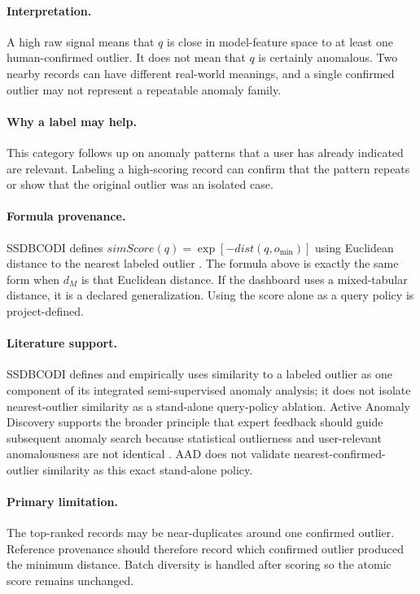 \documentclass[11pt]{article}
\begin{document}
\paragraph{Interpretation.}
A high raw signal means that $q$ is close in model-feature space to at least one
human-confirmed outlier. It does not mean that $q$ is certainly anomalous. Two
nearby records can have different real-world meanings, and a single confirmed
outlier may not represent a repeatable anomaly family.

\paragraph{Why a label may help.}
This category follows up on anomaly patterns that a user has already indicated
are relevant. Labeling a high-scoring record can confirm that the pattern
repeats or show that the original outlier was an isolated case.

\paragraph{Formula provenance.}
SSDBCODI defines $simScore(q)=\exp[-dist(q,o_{\min})]$ using Euclidean distance
to the nearest labeled outlier \cite{deng2022ssdbcodi}. The formula above is
exactly the same form when $d_M$ is that Euclidean distance. If the dashboard
uses a mixed-tabular distance, it is a declared generalization. Using the score
alone as a query policy is project-defined.

\paragraph{Literature support.}
SSDBCODI defines and empirically uses similarity to a labeled outlier as one
component of its integrated semi-supervised anomaly analysis; it does not
isolate nearest-outlier similarity as a stand-alone query-policy ablation.
Active Anomaly Discovery supports the broader
principle that expert feedback should guide subsequent anomaly search because
statistical outlierness and user-relevant anomalousness are not identical
\cite{das2016aad}. AAD does not validate nearest-confirmed-outlier similarity as
this exact stand-alone policy.

\paragraph{Primary limitation.}
The top-ranked records may be near-duplicates around one confirmed outlier.
Reference provenance should therefore record which confirmed outlier produced
the minimum distance. Batch diversity is handled after scoring so the atomic
score remains unchanged.
\end{document}
